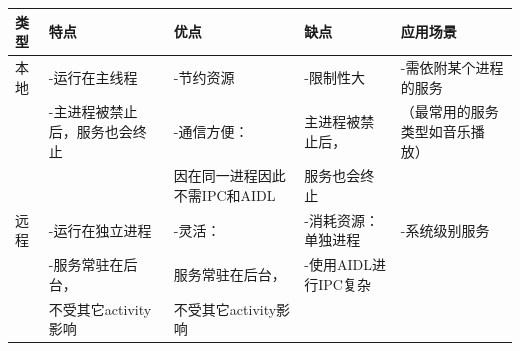 \documentclass[9pt, b5paper]{article}
\begin{document}
\begin{center}
\begin{tabular}{lllll}
\hline
类型 & 特点 & 优点 & 缺点 & 应用场景\\
\hline
本地 & -运行在主线程 & -节约资源 & -限制性大 & -需依附某个进程的服务\\
 & -主进程被禁止后，服务也会终止 & -通信方便： & 主进程被禁止后， & （最常用的服务类型如音乐播放）\\
 &  & 因在同一进程因此不需IPC和AIDL & 服务也会终止 & \\
\hline
远程 & -运行在独立进程 & -灵活： & -消耗资源：单独进程 & -系统级别服务\\
 & -服务常驻在后台， & 服务常驻在后台， & -使用AIDL进行IPC复杂 & \\
 & 不受其它activity影响 & 不受其它activity影响 &  & \\
\hline
\end{tabular}
\end{center}
\end{document}
